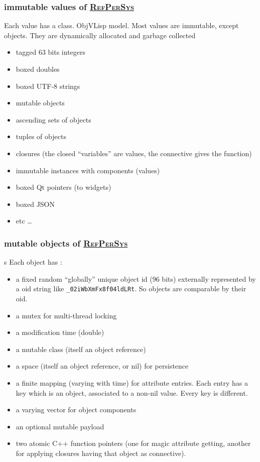 \documentclass[xcolor=svgnames,final,smaller,a4]{beamer}
\newcommand{\RefPerSys}{\href{http://refpersys.org}{\textsc{RefPerSys}}}
\begin{document}
  \begin{frame}
    \frametitle{immutable values of \RefPerSys}

    Each value has a class. ObjVLisp model. Most values are immutable, except objects. They are dynamically allocated and garbage collected

    \begin{itemize}
    \item tagged 63 bits integers
    \item boxed doubles
    \item boxed UTF-8 strings
    \item mutable objects
    \item ascending sets of objects
    \item tuples of objects
    \item closures (the closed ``variables'' are values, the connective gives the function)
    \item immutable instances with components (values)
    \item boxed Qt pointers (to widgets)
      \item boxed JSON
      \item etc \ldots
    \end{itemize}
    
  \end{frame}
  
 

  \begin{frame}
    \frametitle{mutable objects of \RefPerSys}
s
    Each object has :
    \begin{itemize}
    \item a fixed random ``globally'' unique object id (96 bits) externally represented by a oid string like \texttt{\_02iWbXmFx8f04ldLRt}. So objects are comparable by their oid.
    \item a mutex for multi-thread locking
      \item a modification time (double)
      \item a mutable class (itself an object reference)
      \item a space (itself an object reference, or nil) for persistence
    \item a finite mapping (varying with time) for attribute entries. Each entry has a key which is an object, associated to a non-nil value. Every key is different.
    \item a varying vector for object components
    \item an optional mutable payload
      \item two atomic C++ function pointers (one for magic attribute getting, another for applying closures having that object as connective).
    \end{itemize}
    
  \end{frame}
  
\end{document}
